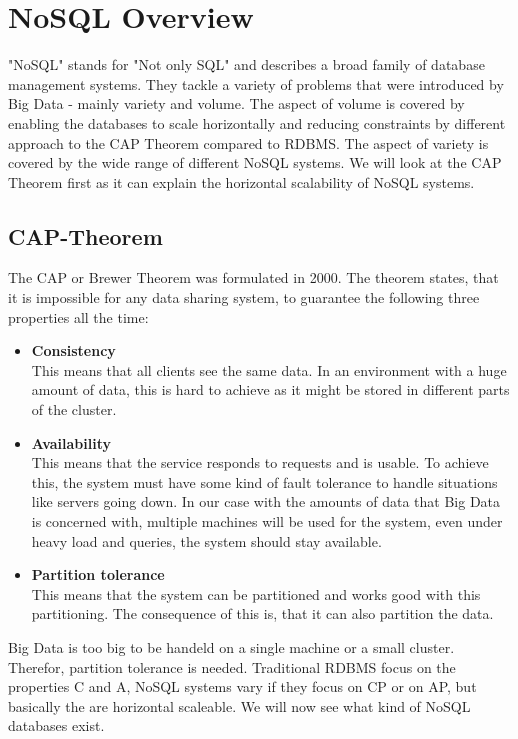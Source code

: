 \documentclass{acm_proc_article-sp}
\begin{document}
\section{NoSQL Overview}

"NoSQL" stands for "Not only SQL" and describes a broad family of database management systems. They tackle a variety of problems that were introduced by Big Data - mainly variety and volume. The aspect of volume is covered by enabling the databases to scale horizontally and reducing constraints by different approach to the CAP Theorem compared to RDBMS. The aspect of variety is covered by the wide range of different NoSQL systems. We will look at the CAP Theorem first as it can explain the horizontal scalability of NoSQL systems.

\subsection{CAP-Theorem}

The CAP or Brewer Theorem\cite{Gilbert:2002:BCF:564585.564601} was formulated in 2000. The  theorem  states, that it is impossible for any data sharing system, to guarantee the following three properties all the time:

\begin{itemize}
	\item \textbf{Consistency} \\ This means that all clients see the same data. In an environment with a huge amount of data, this is hard to achieve as it might be stored in different parts of the cluster.
	\item \textbf{Availability} \\ This means that the service responds to requests and is usable. To achieve this, the system must have some kind of fault tolerance to handle situations like servers going down. In our case with the amounts of data that Big Data is concerned with, multiple machines will be used for the system, even under heavy load and queries, the system should stay available.
	\item \textbf{Partition tolerance} \\ This means that the system can be partitioned and works good with this partitioning. The consequence of this is, that it can also partition the data.
\end{itemize}

Big Data is too big to be handeld on a single machine or a small cluster. Therefor, partition tolerance is needed. Traditional RDBMS focus on the properties C and A, NoSQL systems vary if they focus on CP or on AP, but basically the are horizontal scaleable. We will now see what kind of NoSQL databases exist.
\end{document}
